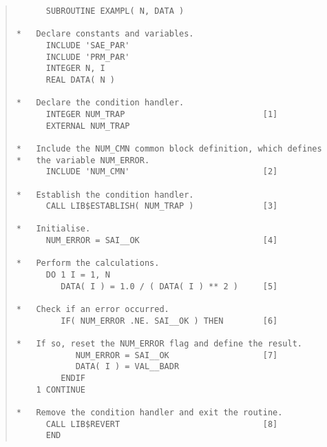 \begin{quote}
\begin{verbatim}
      SUBROUTINE EXAMPL( N, DATA )                
                                                  
*   Declare constants and variables.              
      INCLUDE 'SAE_PAR'                           
      INCLUDE 'PRM_PAR'                           
      INTEGER N, I                                
      REAL DATA( N )                              
                                                  
*   Declare the condition handler.                
      INTEGER NUM_TRAP                            [1]
      EXTERNAL NUM_TRAP                           
                                                  
*   Include the NUM_CMN common block definition, which defines
*   the variable NUM_ERROR.                       
      INCLUDE 'NUM_CMN'                           [2]
                                                  
*   Establish the condition handler.              
      CALL LIB$ESTABLISH( NUM_TRAP )              [3]
                                                  
*   Initialise.                                   
      NUM_ERROR = SAI__OK                         [4]
                                                  
*   Perform the calculations.                     
      DO 1 I = 1, N                               
         DATA( I ) = 1.0 / ( DATA( I ) ** 2 )     [5]
                                                  
*   Check if an error occurred.                   
         IF( NUM_ERROR .NE. SAI__OK ) THEN        [6]
                                                  
*   If so, reset the NUM_ERROR flag and define the result.
            NUM_ERROR = SAI__OK                   [7]
            DATA( I ) = VAL__BADR                 
         ENDIF                                    
    1 CONTINUE                                    
                                                  
*   Remove the condition handler and exit the routine.
      CALL LIB$REVERT                             [8]
      END                                         
\end{verbatim}
\end{quote}

